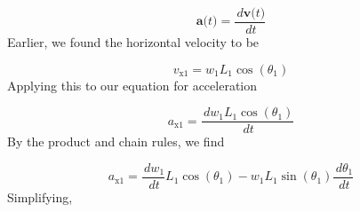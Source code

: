 \documentclass[12pt]{article}
\begin{document}
\begin{displaymath}
\symbf{a}\text{(}t\text{)}=\frac{\,d\symbf{v}\text{(}t\text{)}}{\,dt}
\end{displaymath}
Earlier, we found the horizontal velocity to be

\begin{displaymath}
{v_{\text{x}1}}={w_{1}} {L_{1}} \cos\left({θ_{1}}\right)
\end{displaymath}
Applying this to our equation for acceleration

\begin{displaymath}
{a_{\text{x}1}}=\frac{\,d{w_{1}} {L_{1}} \cos\left({θ_{1}}\right)}{\,dt}
\end{displaymath}
By the product and chain rules, we find

\begin{displaymath}
{a_{\text{x}1}}=\frac{\,d{w_{1}}}{\,dt} {L_{1}} \cos\left({θ_{1}}\right)-{w_{1}} {L_{1}} \sin\left({θ_{1}}\right) \frac{\,d{θ_{1}}}{\,dt}
\end{displaymath}
Simplifying,
\end{document}
